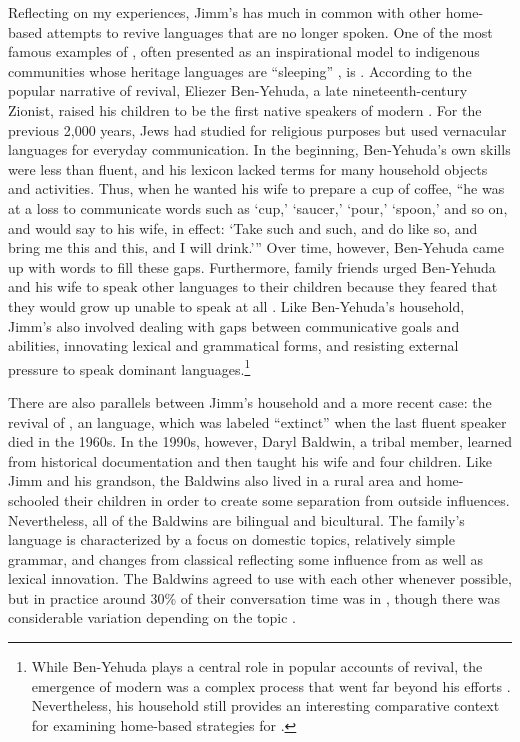 \documentclass[output=paper]{LSP/langsci}
\begin{document}
Reflecting on my experiences, Jimm's  has much in common with other home-based attempts to revive languages that are no longer spoken. One of the most famous examples of , often presented as an inspirational model to indigenous communities whose heritage languages are ``sleeping'' \citep[see][]{Hinton2008}, is . According to the popular narrative of  revival, Eliezer Ben-Yehuda, a late nineteenth-century Zionist, raised his children to be the first native speakers of modern . For the previous 2,000 years, Jews had studied  for religious purposes but used vernacular languages for everyday communication. In the beginning, Ben-Yehuda's own  skills were less than fluent, and his lexicon lacked terms for many household objects and activities. Thus, when he wanted his wife to prepare a cup of coffee, ``he was at a loss to communicate words such as `cup,' `saucer,' `pour,' `spoon,' and so on, and would say to his wife, in effect: `Take such and such, and do like so, and bring me this and this, and I will drink.'\thinspace'' \citep[37--38]{Fellman1973} Over time, however, Ben-Yehuda came up with words to fill these gaps. Furthermore, family friends urged Ben-Yehuda and his wife to speak other languages to their children because they feared that they would grow up unable to speak at all \citep[50--53]{BenAvi1984}. Like Ben-Yehuda's household, Jimm's  also involved dealing with gaps between communicative goals and abilities, innovating lexical and grammatical forms, and resisting external pressure to speak dominant languages.\footnote{While Ben-Yehuda plays a central role in popular accounts of  revival, the emergence of modern  was a complex process that went far beyond his efforts \citep{Harshav1999}. Nevertheless, his household still provides an interesting comparative context for examining home-based strategies for .}

There are also parallels between Jimm's household and a more recent case: the revival of , an  language, which was labeled ``extinct'' when the last fluent speaker died in the 1960s. In the 1990s, however, Daryl Baldwin, a tribal member, learned  from historical documentation and then taught his wife and four children. Like Jimm and his grandson, the Baldwins also lived in a rural area and home-schooled their children in order to create some separation from outside influences. Nevertheless, all of the Baldwins are bilingual and bicultural. The family's language is characterized by a focus on domestic topics, relatively simple grammar, and changes from classical  reflecting some influence from  as well as lexical innovation. The Baldwins agreed to use  with each other whenever possible, but in practice around 30\% of their conversation time was in , though there was considerable variation depending on the topic \citep[14]{Leonard2007}.
\end{document}
